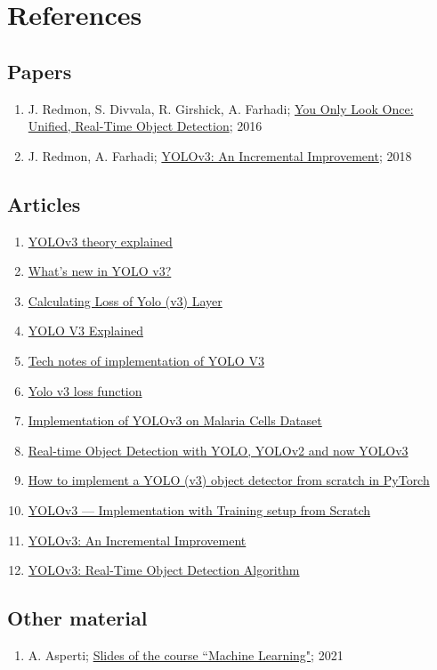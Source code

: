 \documentclass[../report.tex]{subfiles}
\begin{document}
\chapter{References}\label{a:references}
\section{Papers}
\begin{enumerate}
    \item J. Redmon, S. Divvala, R. Girshick, A. Farhadi; \href{https://arxiv.org/abs/1506.02640}{You Only Look Once: Unified, Real-Time Object Detection}; 2016
    \item J. Redmon, A. Farhadi; \href{https://arxiv.org/abs/1804.02767}{YOLOv3: An Incremental Improvement}; 2018
\end{enumerate}

\section{Articles}
\begin{enumerate}
    \item \href{https://pylessons.com/YOLOv3-introduction}{YOLOv3 theory explained}
    \item \href{https://towardsdatascience.com/yolo-v3-object-detection-53fb7d3bfe6b}{What’s new in YOLO v3?}
    \item \href{https://towardsdatascience.com/calculating-loss-of-yolo-v3-layer-8878bfaaf1ff}{Calculating Loss of Yolo (v3) Layer}
    \item \href{https://towardsdatascience.com/yolo-v3-explained-ff5b850390f}{YOLO V3 Explained}
    \item \href{https://sheng-fang.github.io/2020-04-29-implement_yolo/}{Tech notes of implementation of YOLO V3}
    \item \href{https://stats.stackexchange.com/questions/373266/yolo-v3-loss-function}{Yolo v3 loss function}
    \item \href{https://www.linkedin.com/pulse/implementation-yolov3-malaria-cells-dataset-vishnu-dutt-pathak/}{Implementation of YOLOv3 on Malaria Cells Dataset}
    \item \href{https://jonathan-hui.medium.com/real-time-object-detection-with-yolo-yolov2-28b1b93e2088}{Real-time Object Detection with YOLO, YOLOv2 and now YOLOv3}
    \item \href{https://blog.paperspace.com/how-to-implement-a-yolo-object-detector-in-pytorch/}{How to implement a YOLO (v3) object detector from scratch in PyTorch}
    \item \href{https://sannaperzon.medium.com/yolov3-implementation-with-training-setup-from-scratch-30ecb9751cb0}{YOLOv3 — Implementation with Training setup from Scratch}
    \item \href{https://arxiv.org/abs/1804.02767}{YOLOv3: An Incremental Improvement}
    \item \href{https://viso.ai/deep-learning/yolov3-overview/}{YOLOv3: Real-Time Object Detection Algorithm}
\end{enumerate} 

\section{Other material}
\begin{enumerate}
    \item A. Asperti; \href{https://virtuale.unibo.it/course/view.php?id=25968}{Slides of the course ``Machine Learning"}; 2021
\end{enumerate}
\end{document}
